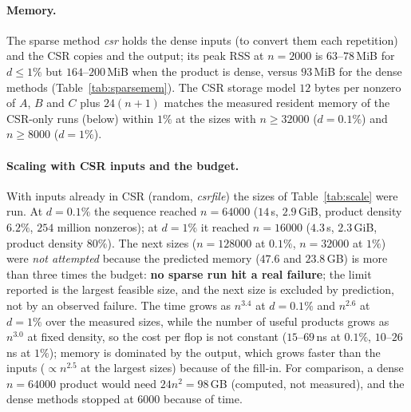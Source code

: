 \paragraph{Memory.} The sparse method \emph{csr} holds the dense inputs (to convert them each repetition) and the CSR copies and the output; its peak RSS at $n=2000$ is $63$--$78$\,MiB for $d\le1\%$ but $164$--$200$\,MiB when the product is dense, versus $93$\,MiB for the dense methods (Table~\ref{tab:sparsemem}).
The CSR storage model $12$ bytes per nonzero of $A$, $B$ and $C$ plus $24(n+1)$ matches the measured resident memory of the CSR-only runs (below) within $1\%$ at the sizes with $n\ge32000$ ($d=0.1\%$) and $n\ge8000$ ($d=1\%$).

\begin{table}[H]
\centering\scriptsize

\caption{$n=2000$: CSR storage of $A$, $B$, $C$ (model) and peak RSS of the \emph{csr} method (dense inputs resident) and of the dense methods.}
\label{tab:sparsemem}
\end{table}

\paragraph{Scaling with CSR inputs and the budget.} With inputs already in CSR (random, \emph{csrfile}) the sizes of Table~\ref{tab:scale} were run. At $d=0.1\%$ the sequence reached $n=64000$ ($14$\,s, $2.9$\,GiB, product density $6.2\%$, $254$ million nonzeros); at $d=1\%$ it reached $n=16000$ ($4.3$\,s, $2.3$\,GiB, product density $80\%$).
The next sizes ($n=128000$ at $0.1\%$, $n=32000$ at $1\%$) were \emph{not attempted} because the predicted memory ($47.6$ and $23.8$\,GB) is more than three times the budget: \textbf{no sparse run hit a real failure}; the limit reported is the largest feasible size, and the next size is excluded by prediction, not by an observed failure.
The time grows as $n^{3.4}$ at $d=0.1\%$ and $n^{2.6}$ at $d=1\%$ over the measured sizes, while the number of useful products grows as $n^{3.0}$ at fixed density, so the cost per flop is not constant ($15$--$69$\,ns at $0.1\%$, $10$--$26$\,ns at $1\%$); memory is dominated by the output, which grows faster than the inputs ($\propto n^{2.5}$ at the largest sizes) because of the fill-in.
For comparison, a dense $n=64000$ product would need $24n^2=98$\,GB (computed, not measured), and the dense methods stopped at $6000$ because of time.

\begin{table}[H]
\centering\scriptsize

\caption{Scaling of the CSR kernel with CSR inputs (random, $d=0.1\%$ and $1\%$). Time = median of the kernel (conversion not applicable); peak RSS measured; CSR est. = $12(\text{nnz}_A+\text{nnz}_B+\text{nnz}_C)+24(n+1)$ bytes.}
\label{tab:scale}
\end{table}

